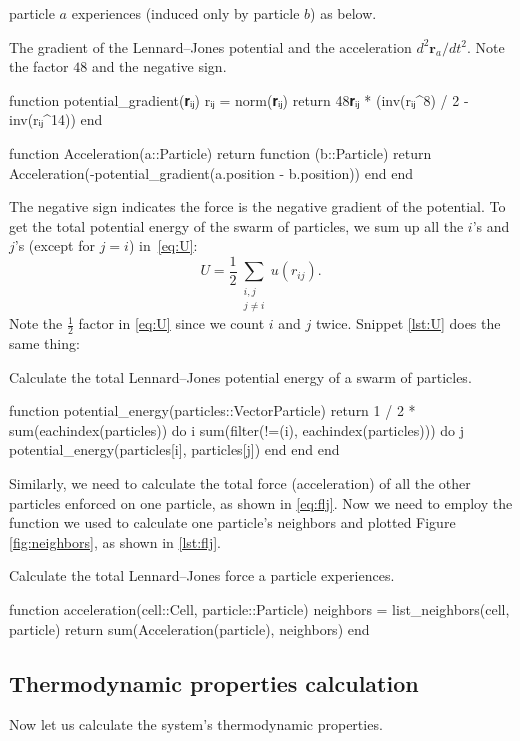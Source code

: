 particle $a$ experiences (induced only by particle $b$) as below.
%
\begin{algorithm}
    \caption{The gradient of the Lennard--Jones potential and the acceleration
        $d^2 \bm{r}_a / d t^2$. Note the factor $48$ and the negative sign.}
    \label{lst:gradient}
    \begin{juliacode}
        function potential_gradient(𝐫ᵢⱼ)
            rᵢⱼ = norm(𝐫ᵢⱼ)
            return 48𝐫ᵢⱼ * (inv(rᵢⱼ^8) / 2 - inv(rᵢⱼ^14))
        end

        function Acceleration(a::Particle)
            return function (b::Particle)
                return Acceleration(-potential_gradient(a.position - b.position))
            end
        end
    \end{juliacode}
\end{algorithm}
%
The negative sign indicates the force is the negative gradient of the potential.
To get the total potential energy of the swarm of particles, we sum up all the $i$'s
and $j$'s (except for $j = i$) in~\eqref{eq:U}:
%
\begin{equation}\label{eq:U}
    U = \frac{ 1 }{ 2 }\sum_{\substack{i, j\\ j \neq i}} u(r_{ij}).
\end{equation}
%
Note the $\frac{ 1 }{ 2 }$ factor in \eqref{eq:U} since we count $i$ and $j$ twice.
Snippet \ref{lst:U} does the same thing:

\begin{algorithm}
    \caption{Calculate the total Lennard--Jones potential energy of a swarm of particles.}
    \label{lst:U}
    \begin{juliacode}
        function potential_energy(particles::Vector{Particle})
            return 1 / 2 * sum(eachindex(particles)) do i
                sum(filter(!=(i), eachindex(particles))) do j
                    potential_energy(particles[i], particles[j])
                end
            end
        end
    \end{juliacode}
\end{algorithm}

Similarly, we need to calculate the total force (acceleration) of all the other particles
enforced on one particle, as shown in \eqref{eq:flj}. Now we need to employ the
 function we used to calculate one particle's neighbors and plotted
Figure \ref{fig:neighbors}, as shown in \ref{lst:flj}.
%
\begin{algorithm}
    \caption{Calculate the total Lennard--Jones force a particle experiences.}
    \label{lst:flj}
    \begin{juliacode}
        function acceleration(cell::Cell, particle::Particle)
            neighbors = list_neighbors(cell, particle)
            return sum(Acceleration(particle), neighbors)
        end
    \end{juliacode}
\end{algorithm}
%


\subsection{Thermodynamic properties calculation}

Now let us calculate the  system's thermodynamic properties.

